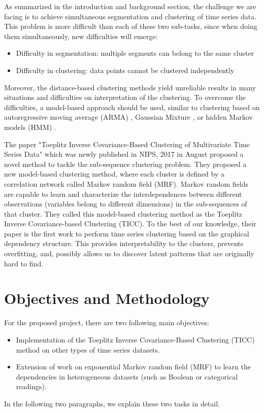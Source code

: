 \documentclass{llncs}
\begin{document}
As summarized in the introduction and background section, the challenge we are facing is to achieve simultaneous segmentation and clustering of time series data. This problem is more difficult than each of these two sub-tasks, since when doing them simultaneously, new difficulties will emerge:
\begin{itemize}
\item Difficulty in segmentation:  multiple segments can belong to the same cluster
\item Difficulty in clustering: data points cannot be clustered independently
\end{itemize}
Moreover, the distance-based clustering methods yield unreliable results in many situations and difficulties on interpretation of the clustering. To overcome the difficulties, a model-based approach should be used, similar to clustering based on autoregressive moving average (ARMA) \cite{xiong2004time}, Gaussian
Mixture \cite{fraley2006mclust}, or hidden Markov models (HMM) \cite{smyth1997clustering}.

The paper "Toeplitz Inverse Covariance-Based Clustering of Multivariate Time Series Data" \cite{tiic} which was newly published in NIPS, 2017 in August proposed a novel method to tackle the sub-sequence clustering problem. They proposed a new model-based clustering method, where each cluster is defined by a correlation network called Markov random field (MRF). Markov random fields are capable to learn and characterize the interdependences between different observations (variables belong to different dimensions) in the sub-sequences of that cluster. They called this model-based clustering method as the Toeplitz Inverse Covariance-based Clustering (TICC). To the best of our knowledge, their paper is the first work to perform time series clustering based on the graphical dependency structure. This provides interpretability to the clusters, prevents overfitting, and, possibly allows us to discover latent patterns that are originally hard to find.

\section{Objectives and Methodology}
For the proposed project, there are two following main objectives:
\begin{itemize}
\item Implementation of the Toeplitz Inverse Covariance-Based Clustering (TICC) method on other types of time series datasets.
\item Extension of work on exponential Markov random field (MRF) to learn the dependencies in heterogeneous datasets (such as Boolean or categorical readings).
\end{itemize}In the following two paragraphs, we explain these two tasks in detail.
\end{document}
